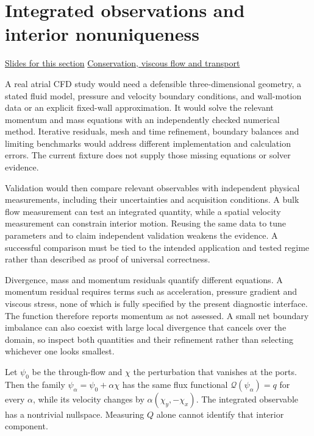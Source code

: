 \documentclass[11pt,letterpaper]{article}
\theoremstyle{definition}\newtheorem{definition}{Definition}\newtheorem{example}{Example}
\numberwithin{equation}{section}
\begin{document}
\section{Integrated observations and interior nonuniqueness}
\hypertarget{note-integrated-observations-and-interior-nonuniqueness}{}\label{note:integrated-observations-and-interior-nonuniqueness}
{\small \href{slides.html\#frame=an-interior-perturbation\&step=1}{Slides for this section} \quad \href{../modules/cfd/index.html}{Conservation, viscous flow and transport}}\par
A real atrial CFD study would need a defensible three-dimensional geometry, a stated fluid model, pressure and velocity boundary conditions, and wall-motion data or an explicit fixed-wall approximation. It would solve the relevant momentum and mass equations with an independently checked numerical method. Iterative residuals, mesh and time refinement, boundary balances and limiting benchmarks would address different implementation and calculation errors. The current fixture does not supply those missing equations or solver evidence.

Validation would then compare relevant observables with independent physical measurements, including their uncertainties and acquisition conditions. A bulk flow measurement can test an integrated quantity, while a spatial velocity measurement can constrain interior motion. Reusing the same data to tune parameters and to claim independent validation weakens the evidence. A successful comparison must be tied to the intended application and tested regime rather than described as proof of universal correctness.

Divergence, mass and momentum residuals quantify different equations. A momentum residual requires terms such as acceleration, pressure gradient and viscous stress, none of which is fully specified by the present diagnostic interface. The function therefore reports momentum as not assessed. A small net boundary imbalance can also coexist with large local divergence that cancels over the domain, so inspect both quantities and their refinement rather than selecting whichever one looks smallest.

Let $\psi_0$ be the through-flow and $\chi$ the perturbation that vanishes at the ports. Then the family $\psi_\alpha=\psi_0+\alpha\chi$ has the same flux functional $\mathcal Q(\psi_\alpha)=q$ for every $\alpha$, while its velocity changes by $\alpha(\chi_y,-\chi_x)$. The integrated observable has a nontrivial nullspace. Measuring $Q$ alone cannot identify that interior component.
\end{document}
